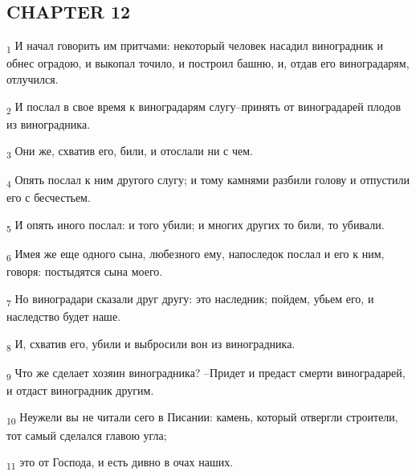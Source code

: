 \subsection{CHAPTER 12}
\begin{tcolorbox}
\textsubscript{1} И начал говорить им притчами: некоторый человек насадил виноградник и обнес оградою, и выкопал точило, и построил башню, и, отдав его виноградарям, отлучился.
\end{tcolorbox}
\begin{tcolorbox}
\textsubscript{2} И послал в свое время к виноградарям слугу--принять от виноградарей плодов из виноградника.
\end{tcolorbox}
\begin{tcolorbox}
\textsubscript{3} Они же, схватив его, били, и отослали ни с чем.
\end{tcolorbox}
\begin{tcolorbox}
\textsubscript{4} Опять послал к ним другого слугу; и тому камнями разбили голову и отпустили его с бесчестьем.
\end{tcolorbox}
\begin{tcolorbox}
\textsubscript{5} И опять иного послал: и того убили; и многих других то били, то убивали.
\end{tcolorbox}
\begin{tcolorbox}
\textsubscript{6} Имея же еще одного сына, любезного ему, напоследок послал и его к ним, говоря: постыдятся сына моего.
\end{tcolorbox}
\begin{tcolorbox}
\textsubscript{7} Но виноградари сказали друг другу: это наследник; пойдем, убьем его, и наследство будет наше.
\end{tcolorbox}
\begin{tcolorbox}
\textsubscript{8} И, схватив его, убили и выбросили вон из виноградника.
\end{tcolorbox}
\begin{tcolorbox}
\textsubscript{9} Что же сделает хозяин виноградника? --Придет и предаст смерти виноградарей, и отдаст виноградник другим.
\end{tcolorbox}
\begin{tcolorbox}
\textsubscript{10} Неужели вы не читали сего в Писании: камень, который отвергли строители, тот самый сделался главою угла;
\end{tcolorbox}
\begin{tcolorbox}
\textsubscript{11} это от Господа, и есть дивно в очах наших.
\end{tcolorbox}
